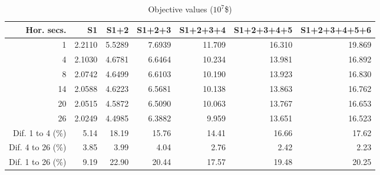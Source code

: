 \begin{table}
\begin{small}
\begin{tabular}{r|rrrrrr}
Hor. secs.				&    S1		&  S1+2		& S1+2+3	&S1+2+3+4	&S1+2+3+4+5&S1+2+3+4+5+6\\		
\hline
1									& 2.2110	& 5.5289	& 7.6939	& 11.709	&	16.310	&	19.869\\
4									& 2.1030	& 4.6781	& 6.6464	& 10.234	&	13.981	&	16.892\\
8									& 2.0742	& 4.6499	& 6.6103	& 10.190	&	13.923	&	16.830\\
14								& 2.0588	& 4.6223	& 6.5681	& 10.138	&	13.863	&	16.762\\
20								& 2.0515	& 4.5872	& 6.5090	& 10.063	&	13.767	&	16.653\\
26								& 2.0249	& 4.4985	& 6.3882	&  9.959	&	13.651	&	16.523\\
\hline
Dif. 1 to 4 (\%)	&   5.14	&  18.19	&  15.76	&  14.41	&	 16.66	&	 17.62\\	
Dif. 4 to 26 (\%)	&   3.85	&   3.99	&   4.04	&   2.76	&	  2.42	&	  2.23\\
Dif. 1 to 26 (\%)	&   9.19	&  22.90	&  20.44	&  17.57	&	 19.48	&	 20.25\\
\end{tabular}
\caption{Objective values ($10^7$\$)}\label{tab:BigObj}
\end{small}
\end{table}

